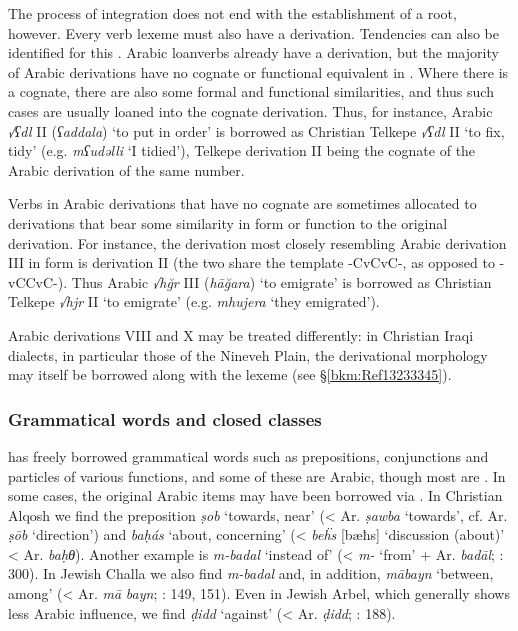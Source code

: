 \documentclass[output=paper]{langsci/langscibook}
\begin{document}
The process of integration does not end with the establishment of a {root}, however. Every verb lexeme must also have a {derivation}. Tendencies can also be identified for this \citep{Coghill2015}. Arabic loanverbs already have a {derivation}, but the majority of Arabic derivations have no {cognate} or functional equivalent in . Where there is a {cognate}, there are also some formal and functional similarities, and thus such cases are usually loaned into the {cognate} {derivation}. Thus, for instance, Arabic \textit{√ʕdl} II (\textit{ʕaddala}) ‘to put in order’ is borrowed as Christian Telkepe \textit{√ʕdl} II ‘to fix, tidy’ (e.g. \textit{mʕudəlli} ‘I tidied’), Telkepe {derivation} II being the {cognate} of the Arabic {derivation} of the same number.

Verbs in Arabic derivations that have no {cognate} are sometimes allocated to derivations that bear some similarity in form or function to the original {derivation}. For instance, the  {derivation} most closely resembling Arabic {derivation} III in form is {derivation} II (the two share the template -CvCvC-, as opposed to -vCCvC-). Thus Arabic \textit{√hğr} III (\textit{hāğara}) ‘to emigrate’ is borrowed as Christian Telkepe \textit{√hjr} II ‘to emigrate’ (e.g. \textit{mhujera} ‘they emigrated’).

Arabic derivations VIII and X may be treated differently: in Christian Iraqi dialects, in particular those of the Nineveh Plain, the {derivational} morphology may itself be borrowed along with the lexeme (see §\ref{bkm:Ref13233345}).

\subsubsection{Grammatical words and closed classes}\label{closedclass}\largerpage

 has freely borrowed grammatical words such as {prepositions}, conjunctions and particles of various functions, and some of these are Arabic, though most are . In some cases, the original Arabic items may have been borrowed via . In Christian Alqosh we find the {preposition} \textit{ṣob} ‘towards, near’ (< Ar. \textit{ṣawba} ‘towards’, cf.  Ar. \textit{ṣōb} ‘direction’) and \textit{baḥás} ‘about, concerning’ (<  \textit{be\"{h}s} [bæħs] ‘discussion (about)’ < Ar. \textit{baḥθ}). Another example is \textit{m-badal} ‘instead of’ (< \textit{m-} ‘from’ +  Ar. \textit{badāl}; \citealt{Coghill2004}: 300). In Jewish Challa we also find \textit{m-badal} and, in addition, \textit{mābayn} ‘between, among’ (< Ar. \textit{mā} \textit{bayn}; \citealt{Fassberg2010}: 149, 151). Even in Jewish Arbel, which generally shows less Arabic influence, we find \textit{ḍidd} ‘against’ (< Ar. \textit{ḍidd}; \citealt{Khan1999}: 188).
\end{document}
